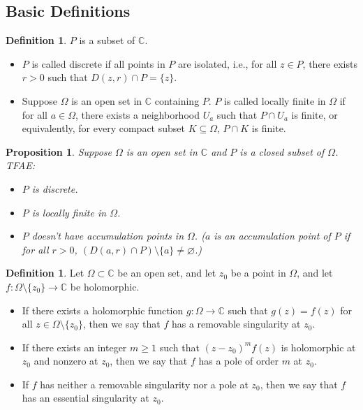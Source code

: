 \documentclass{article}
\newtheorem{proposition}[theorem]{Proposition}
\theoremstyle{definition}
\newtheorem{definition}[theorem]{Definition}
\newcommand{\C}{\mathbb{C}}
\renewcommand{\geq}{\geqslant}
\begin{document}
\subsection{Basic Definitions}
\begin{definition}
    $P$ is a subset of $\C$.
    \begin{itemize}
        \item $P$ is called discrete if all points in $P$ are isolated, i.e., for all $z\in P$, there exists $r>0$ such that $D(z,r)\cap P=\{z\}$.
        \item Suppose $\Omega$ is an open set in $\C$ containing $P$. $P$ is called locally finite in $\Omega$ if for all $a\in \Omega$, there exists a neighborhood $U_a$ such that $P\cap U_a$ is finite, or equivalently, for every compact subset $K\subseteq \Omega$, $P\cap K$ is finite.
    \end{itemize}
\end{definition} 
\begin{proposition}
    Suppose $\Omega$ is an open set in $\C$ and $P$ is a closed subset of $\Omega$. TFAE: 
    \begin{itemize}
        \item $P$ is discrete.
        \item $P$ is locally finite in $\Omega$.
        \item $P$ doesn't have accumulation points in $\Omega$. ($a$ is an accumulation point of $P$ if for all $r>0$, $(D(a,r)\cap P)\setminus\{a\}\neq \varnothing$.)
    \end{itemize}
\end{proposition}
\begin{definition}
    Let \(\Omega\subset\C\) be an open set, and let $z_0$ be a point in $\Omega$, and let \(f\colon\Omega\setminus\{z_0\}\to\C\) be holomorphic. 
    \begin{itemize}
        \item If there exists a holomorphic function \(g\colon\Omega\to\C\) such that \(g(z)=f(z)\) for all \(z\in \Omega\setminus\{z_0\}\), then we say that \(f\) has a removable singularity at \(z_0\).
        \item If there exists an integer \(m\geq 1\) such that $(z-z_0)^m f(z)$ is holomorphic at $z_0$ and nonzero at $z_0$, then we say that \(f\) has a pole of order \(m\) at \(z_0\).
        \item If \(f\) has neither a removable singularity nor a pole at \(z_0\), then we say that \(f\) has an essential singularity at \(z_0\).
    \end{itemize}
\end{definition}
\end{document}

